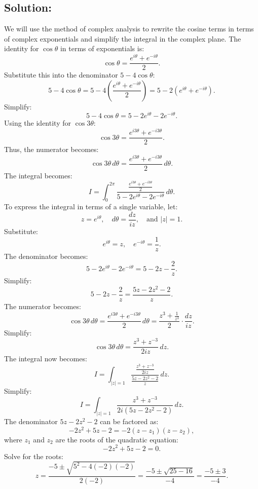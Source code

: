 \documentclass[12pt]{article}
\begin{document}
    \subsection*{Solution:}
        We will use the method of complex analysis to rewrite the cosine terms in terms of complex exponentials and simplify the integral in the complex plane.
        The identity for \(\cos\theta\) in terms of exponentials is:
        \[
        \cos\theta = \frac{e^{i\theta} + e^{-i\theta}}{2}.
        \]
        Substitute this into the denominator \(5 - 4\cos\theta\):
        \[
        5 - 4\cos\theta = 5 - 4\left(\frac{e^{i\theta} + e^{-i\theta}}{2}\right) = 5 - 2(e^{i\theta} + e^{-i\theta}).
        \]
        Simplify:
        \[
        5 - 4\cos\theta = 5 - 2e^{i\theta} - 2e^{-i\theta}.
        \]
        Using the identity for \(\cos 3\theta\):
        \[
        \cos 3\theta = \frac{e^{i3\theta} + e^{-i3\theta}}{2}.
        \]
        Thus, the numerator becomes:
        \[
        \cos 3\theta \, d\theta = \frac{e^{i3\theta} + e^{-i3\theta}}{2} \, d\theta.
        \]
        The integral becomes:
        \[
        I = \int_{0}^{2\pi} \frac{\frac{e^{i3\theta} + e^{-i3\theta}}{2}}{5 - 2e^{i\theta} - 2e^{-i\theta}} \, d\theta.
        \]
        To express the integral in terms of a single variable, let:
        \[
        z = e^{i\theta}, \quad d\theta = \frac{dz}{iz}, \quad \text{and } |z| = 1.
        \]
        Substitute:
        \[
        e^{i\theta} = z, \quad e^{-i\theta} = \frac{1}{z}.
        \]
        The denominator becomes:
        \[
        5 - 2e^{i\theta} - 2e^{-i\theta} = 5 - 2z - \frac{2}{z}.
        \]
        Simplify:
        \[
        5 - 2z - \frac{2}{z} = \frac{5z - 2z^2 - 2}{z}.
        \]
        The numerator becomes:
        \[
        \cos 3\theta \, d\theta = \frac{e^{i3\theta} + e^{-i3\theta}}{2} \, d\theta = \frac{z^3 + \frac{1}{z^3}}{2} \cdot \frac{dz}{iz}.
        \]
        Simplify:
        \[
        \cos 3\theta \, d\theta = \frac{z^3 + z^{-3}}{2iz} \, dz.
        \]
        The integral now becomes:
        \[
        I = \int_{|z|=1} \frac{\frac{z^3 + z^{-3}}{2iz}}{\frac{5z - 2z^2 - 2}{z}} \, dz.
        \]
        Simplify:
        \[
        I = \int_{|z|=1} \frac{z^3 + z^{-3}}{2i(5z - 2z^2 - 2)} \, dz.
        \]
        The denominator \(5z - 2z^2 - 2\) can be factored as:
        \[
        -2z^2 + 5z - 2 = -2(z - z_1)(z - z_2),
        \]
        where \(z_1\) and \(z_2\) are the roots of the quadratic equation:
        \[
        -2z^2 + 5z - 2 = 0.
        \]
        Solve for the roots:
        \[
        z = \frac{-5 \pm \sqrt{5^2 - 4(-2)(-2)}}{2(-2)} = \frac{-5 \pm \sqrt{25 - 16}}{-4} = \frac{-5 \pm 3}{-4}.
        \]
\end{document}
